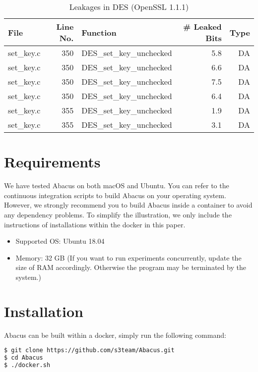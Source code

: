 \documentclass[10pt,conference]{IEEEtran}
\newcommand{\tool}{\textsf{Abacus}}
\renewcommand{\baselinestretch}{0.97}
\begin{document}
\begin{table}[h!]
\centering\tiny\scriptsize
\caption{Leakages in DES (OpenSSL 1.1.1)}\label{tab:DESOpenSSL1.1.1}
\begin{tabular}{lrlrr}
\hline
\textbf{File} & \textbf{Line No.} & \textbf{Function} & \textbf{\# Leaked Bits} & \textbf{Type} \\\hline
set\_key.c& 350&DES\_set\_key\_unchecked&5.8 &DA\\
set\_key.c& 350&DES\_set\_key\_unchecked&6.6 &DA\\
set\_key.c& 350&DES\_set\_key\_unchecked&7.5 &DA\\
set\_key.c& 350&DES\_set\_key\_unchecked&6.4 &DA\\
set\_key.c& 355&DES\_set\_key\_unchecked&1.9 &DA\\
set\_key.c& 355&DES\_set\_key\_unchecked&3.1 &DA\\
\hline
\end{tabular}
\renewcommand{\baselinestretch}{1.0}\selectfont
\end{table}

\section{Requirements}
We have tested \tool{} on both macOS and Ubuntu. You can refer to the continuous integration scripts to build Abacus on your operating system. However, we strongly recommend you to build \tool{} inside a container to avoid any dependency problems. To simplify the illustration, we only include the instructions of installations within the docker in this paper.
\begin{itemize}
\item Supported OS: Ubuntu 18.04
\item Memory: 32 GB (If you want to run experiments concurrently, update the size of RAM
     accordingly. Otherwise the program may be terminated by the system.)
\end{itemize}

\section{Installation}

\tool{} can be built within a docker, simply run the following command:

\begin{lstlisting}[language=bash]
$ git clone https://github.com/s3team/Abacus.git
$ cd Abacus
$ ./docker.sh
\end{lstlisting}
\end{document}
